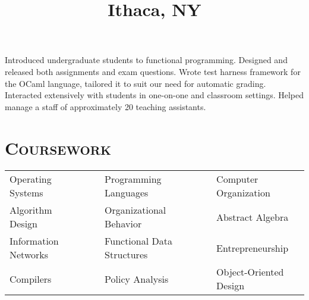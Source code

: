 \begin{resume}
\title{Ithaca, NY}
\location{}
\begin{position}
Introduced undergraduate students to functional programming.
Designed and released both assignments and exam questions. 
Wrote test harness framework for the OCaml language, tailored it to suit our need for automatic grading.
Interacted extensively with students in one-on-one and classroom settings.
Helped manage a staff of approximately 20 teaching assistants.
\end{position}





\vspace{1.00cm}

\renewcommand*\arraystretch{1.2}
\section{\textsc{Coursework}}
 \begin{tabular}{lllll}
 Operating Systems      & \ \ & Programming Languages           & \ \ & Computer Organization \\
 Algorithm Design      & \ \ & Organizational Behavior       & \ \ & Abstract Algebra    \\
 Information Networks     & \ \ & Functional Data Structures       & \ \ &  Entrepreneurship       \\
 Compilers      & \ \ &  Policy Analysis   & \ \ & Object-Oriented Design   \\
 \end{tabular}\\


\end{resume}
